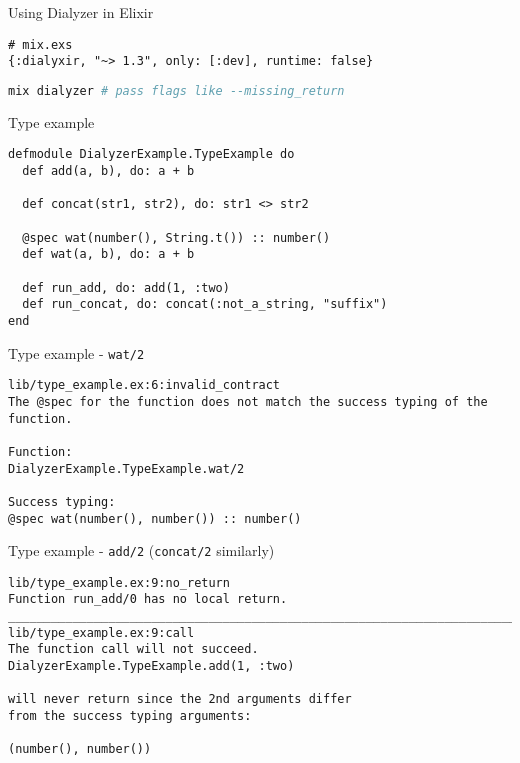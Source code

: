 \documentclass[
  ignorenonframetext,
]{beamer}
\newcommand{\passthrough}[1]{#1}
\begin{document}
\begin{frame}[fragile]{Using Dialyzer in Elixir}
\protect\hypertarget{using-dialyzer-in-elixir}{}
\begin{lstlisting}
# mix.exs
{:dialyxir, "~> 1.3", only: [:dev], runtime: false}
\end{lstlisting}

\begin{lstlisting}[language=bash, org-language=sh]
mix dialyzer # pass flags like --missing_return
\end{lstlisting}
\end{frame}

\begin{frame}[fragile]{Type example}
\protect\hypertarget{type-example}{}
\begin{lstlisting}
defmodule DialyzerExample.TypeExample do
  def add(a, b), do: a + b

  def concat(str1, str2), do: str1 <> str2

  @spec wat(number(), String.t()) :: number()
  def wat(a, b), do: a + b

  def run_add, do: add(1, :two)
  def run_concat, do: concat(:not_a_string, "suffix")
end
\end{lstlisting}
\end{frame}

\begin{frame}[fragile]{Type example - \passthrough{\lstinline!wat/2!}}
\protect\hypertarget{type-example---wat2}{}
\begin{lstlisting}
lib/type_example.ex:6:invalid_contract
The @spec for the function does not match the success typing of the function.

Function:
DialyzerExample.TypeExample.wat/2

Success typing:
@spec wat(number(), number()) :: number()
\end{lstlisting}
\end{frame}

\begin{frame}[fragile]{Type example - \passthrough{\lstinline!add/2!}
(\passthrough{\lstinline!concat/2!} similarly)}
\protect\hypertarget{type-example---add2-concat2-similarly}{}
\begin{lstlisting}
lib/type_example.ex:9:no_return
Function run_add/0 has no local return.
________________________________________________________________________________
lib/type_example.ex:9:call
The function call will not succeed.
DialyzerExample.TypeExample.add(1, :two)

will never return since the 2nd arguments differ
from the success typing arguments:

(number(), number())

\end{lstlisting}
\end{frame}
\end{document}

